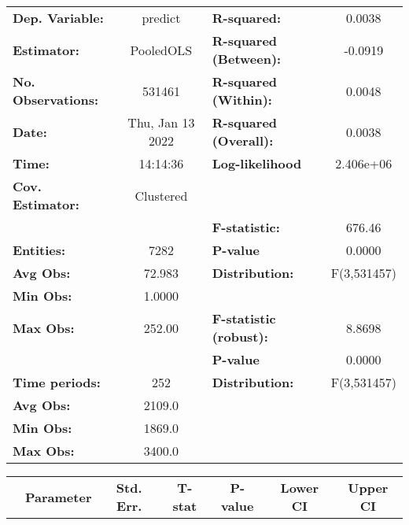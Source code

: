 \begin{center}
\begin{tabular}{lclc}
\toprule
\textbf{Dep. Variable:}    &      predict       & \textbf{  R-squared:         }   &      0.0038      \\
\textbf{Estimator:}        &     PooledOLS      & \textbf{  R-squared (Between):}  &     -0.0919      \\
\textbf{No. Observations:} &       531461       & \textbf{  R-squared (Within):}   &      0.0048      \\
\textbf{Date:}             &  Thu, Jan 13 2022  & \textbf{  R-squared (Overall):}  &      0.0038      \\
\textbf{Time:}             &      14:14:36      & \textbf{  Log-likelihood     }   &    2.406e+06     \\
\textbf{Cov. Estimator:}   &     Clustered      & \textbf{                     }   &                  \\
\textbf{}                  &                    & \textbf{  F-statistic:       }   &      676.46      \\
\textbf{Entities:}         &        7282        & \textbf{  P-value            }   &      0.0000      \\
\textbf{Avg Obs:}          &       72.983       & \textbf{  Distribution:      }   &   F(3,531457)    \\
\textbf{Min Obs:}          &       1.0000       & \textbf{                     }   &                  \\
\textbf{Max Obs:}          &       252.00       & \textbf{  F-statistic (robust):} &      8.8698      \\
\textbf{}                  &                    & \textbf{  P-value            }   &      0.0000      \\
\textbf{Time periods:}     &        252         & \textbf{  Distribution:      }   &   F(3,531457)    \\
\textbf{Avg Obs:}          &       2109.0       & \textbf{                     }   &                  \\
\textbf{Min Obs:}          &       1869.0       & \textbf{                     }   &                  \\
\textbf{Max Obs:}          &       3400.0       & \textbf{                     }   &                  \\
\bottomrule
\end{tabular}
\begin{tabular}{lcccccc}
                & \textbf{Parameter} & \textbf{Std. Err.} & \textbf{T-stat} & \textbf{P-value} & \textbf{Lower CI} & \textbf{Upper CI}  \\

\end{tabular}
\end{center}
